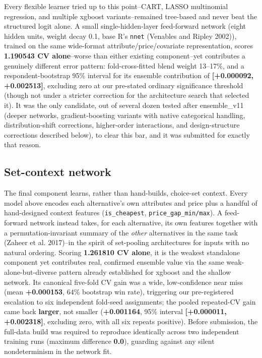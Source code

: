 \documentclass[
  9.5pt,
]{article}
\begin{document}
Every flexible learner tried up to this point--CART, LASSO multinomial
regression, and multiple xgboost variants--remained tree-based and never
beat the structured logit alone. A small single-hidden-layer
feed-forward network (eight hidden units, weight decay 0.1, base R's
\texttt{nnet} (Venables and Ripley 2002)), trained on the same
wide-format attribute/price/covariate representation, scores
\textbf{1.190543 CV alone}--worse than either existing component--yet
contributes a genuinely different error pattern: fold-cross-fitted blend
weight 13--17\%, and a respondent-bootstrap 95\% interval for its
ensemble contribution of \textbf{{[}+0.000092, +0.002513{]}}, excluding
zero at our pre-stated ordinary significance threshold (though not under
a stricter correction for the architecture search that selected it). It
was the only candidate, out of several dozen tested after ensemble\_v11
(deeper networks, gradient-boosting variants with native categorical
handling, distribution-shift corrections, higher-order interactions, and
design-structure corrections described below), to clear this bar, and it
was submitted for exactly that reason.

\subsection{Set-context network}\label{set-context-network}

The final component learns, rather than hand-builds, choice-set context.
Every model above encodes each alternative's own attributes and price
plus a handful of hand-designed context features (\texttt{is\_cheapest},
\texttt{price\_gap\_min/max}). A feed-forward network instead takes, for
each alternative, its own features together with a permutation-invariant
summary of the \emph{other} alternatives in the same task (Zaheer et al.
2017)--in the spirit of set-pooling architectures for inputs with no
natural ordering. Scoring \textbf{1.261810 CV alone}, it is the weakest
standalone component yet contributes real, confirmed ensemble value via
the same weak-alone-but-diverse pattern already established for xgboost
and the shallow network. Its canonical five-fold CV gain was a wide,
low-confidence near miss (mean \textbf{+0.000153}, 64\% bootstrap win
rate), triggering our pre-registered escalation to six independent
fold-seed assignments; the pooled repeated-CV gain came back
\textbf{larger}, not smaller (\textbf{+0.001164}, 95\% interval
\textbf{{[}+0.000011, +0.002318{]}}, excluding zero, with all six
repeats positive). Before submission, the full-data build was required
to reproduce identically across two independent training runs (maximum
difference \textbf{0.0}), guarding against any silent nondeterminism in
the network fit.
\end{document}

